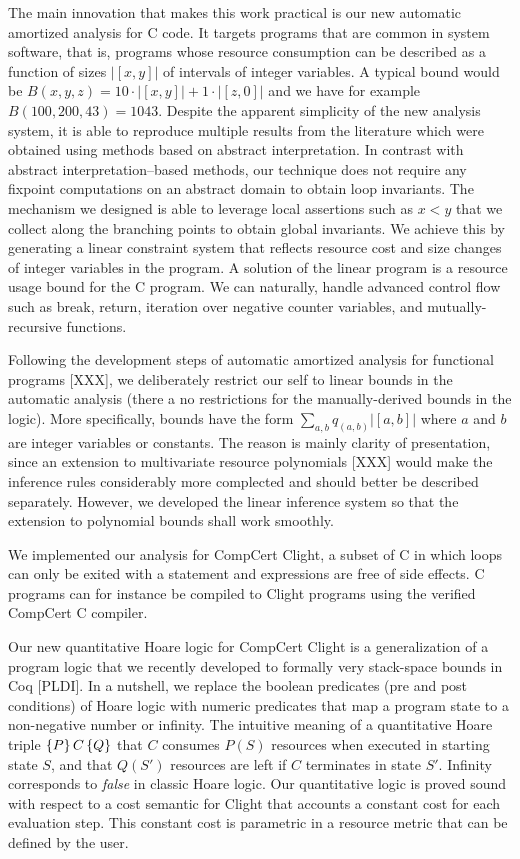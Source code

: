 \documentclass[nocopyrightspace,preprint]{sigplanconf}
\begin{document}
The main innovation that makes this work practical is our new
automatic amortized analysis for C code.  It targets programs that are
common in system software, that is, programs whose resource
consumption can be described as a function of sizes $|[x,y]|$ of
intervals of integer variables.  A typical bound would be $B(x,y,z) =
10{\cdot}|[x,y]| + 1{\cdot}|[z,0]|$ and we have for example
$B(100,200,43) = 1043$.
%
Despite the apparent simplicity of the new analysis system, it is able
to reproduce multiple results from the literature which were obtained
using methods based on abstract interpretation.  In contrast with
abstract interpretation--based methods, our technique does not require
any fixpoint computations on an abstract domain to obtain loop
invariants.  The mechanism we designed is able to leverage local
assertions such as $x < y$ that we collect along the branching points
to obtain global invariants.  We achieve this by generating a linear
constraint system that reflects resource cost and size changes of
integer variables in the program.  A solution of the linear program is
a resource usage bound for the C program.  We can naturally, handle
advanced control flow such as break, return, iteration over negative
counter variables, and mutually-recursive functions.

Following the development steps of automatic amortized analysis for
functional programs [XXX], we deliberately restrict our self to linear
bounds in the automatic analysis (there a no restrictions for the
manually-derived bounds in the logic).  More specifically, bounds have
the form $\sum_{a,b} q_{(a,b)} |[a,b]|$ where $a$ and $b$ are integer
variables or constants.  The reason is mainly clarity of presentation,
since an extension to multivariate resource polynomials [XXX] would
make the inference rules considerably more complected and should
better be described separately.  However, we developed the linear
inference system so that the extension to polynomial bounds shall
work smoothly.  

We implemented our analysis for CompCert Clight, a subset of C in
which loops can only be exited with a  statement and
expressions are free of side effects.  C programs can for instance be
compiled to Clight programs using the verified CompCert C compiler.

Our new quantitative Hoare logic for CompCert Clight is a
generalization of a program logic that we recently developed to
formally very stack-space bounds in Coq [PLDI].  In a nutshell, we
replace the boolean predicates (pre and post conditions) of Hoare
logic with numeric predicates that map a program state to a
non-negative number or infinity.  The intuitive meaning of a
quantitative Hoare triple $\{P\}\, C\, \{Q\}$ that $C$ consumes $P(S)$
resources when executed in starting state $S$, and that $Q(S')$
resources are left if $C$ terminates in state $S'$.  Infinity
corresponds to \emph{false} in classic Hoare logic.  Our quantitative
logic is proved sound with respect to a cost semantic for Clight that
accounts a constant cost for each evaluation step.  This constant cost
is parametric in a resource metric that can be defined by the user.
\end{document}
